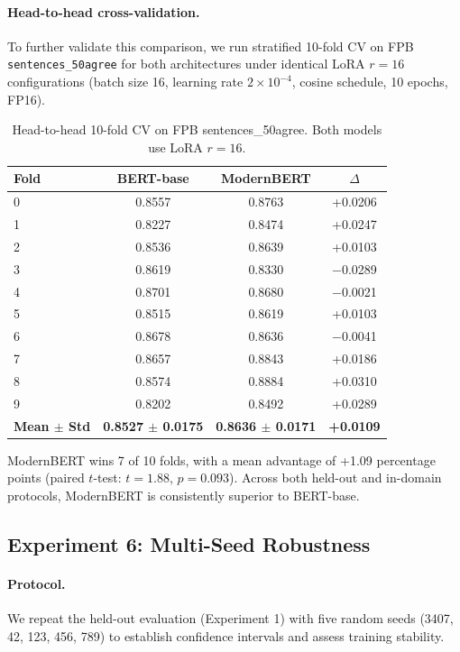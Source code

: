 \documentclass[11pt]{article}
\begin{document}
\paragraph{Head-to-head cross-validation.}
To further validate this comparison, we run stratified 10-fold CV on FPB \texttt{sentences\_50agree} for both architectures under identical LoRA $r=16$ configurations (batch size 16, learning rate $2 \times 10^{-4}$, cosine schedule, 10 epochs, FP16).

\begin{table}[h]
\centering
\caption{Head-to-head 10-fold CV on FPB sentences\_50agree. Both models use LoRA $r=16$.}
\label{tab:head-to-head-cv}
\begin{tabular}{lccc}
\toprule
\textbf{Fold} & \textbf{BERT-base} & \textbf{ModernBERT} & \textbf{$\Delta$} \\
\midrule
0  & 0.8557 & 0.8763 & +0.0206 \\
1  & 0.8227 & 0.8474 & +0.0247 \\
2  & 0.8536 & 0.8639 & +0.0103 \\
3  & 0.8619 & 0.8330 & $-$0.0289 \\
4  & 0.8701 & 0.8680 & $-$0.0021 \\
5  & 0.8515 & 0.8619 & +0.0103 \\
6  & 0.8678 & 0.8636 & $-$0.0041 \\
7  & 0.8657 & 0.8843 & +0.0186 \\
8  & 0.8574 & 0.8884 & +0.0310 \\
9  & 0.8202 & 0.8492 & +0.0289 \\
\midrule
\textbf{Mean $\pm$ Std} & \textbf{0.8527 $\pm$ 0.0175} & \textbf{0.8636 $\pm$ 0.0171} & \textbf{+0.0109} \\
\bottomrule
\end{tabular}
\end{table}

ModernBERT wins 7 of 10 folds, with a mean advantage of +1.09 percentage points (paired $t$-test: $t = 1.88$, $p = 0.093$). Across both held-out and in-domain protocols, ModernBERT is consistently superior to BERT-base.

\subsection{Experiment 6: Multi-Seed Robustness}
\label{sec:multiseed}

\paragraph{Protocol.}
We repeat the held-out evaluation (Experiment 1) with five random seeds (3407, 42, 123, 456, 789) to establish confidence intervals and assess training stability.
\end{document}
